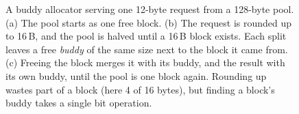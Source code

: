 \begin{figure}[tbp]
\caption{A buddy allocator serving one 12-byte request from a 128-byte
  pool. (a) The pool starts as one free block. (b) The request is rounded up
  to 16\,B, and the pool is halved until a 16\,B block exists. Each split
  leaves a free \emph{buddy} of the same size next to the block it came
  from. (c) Freeing the block merges it with its buddy, and the result with
  its own buddy, until the pool is one block again. Rounding up wastes part
  of a block (here 4 of 16 bytes), but finding a block's buddy takes a
  single bit operation.}
\label{fig:buddy-alloc}
\end{figure}
